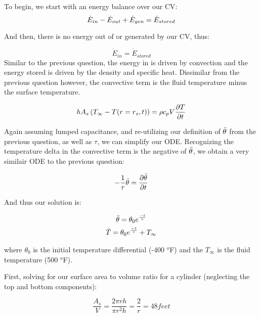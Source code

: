 \documentclass{article}
\begin{document}

To begin, we start with an energy balance over our CV:
\begin{equation}
    \Dot{E}_{in} - \Dot{E}_{out} + \Dot{E}_{gen} = \Dot{E}_{stored}
\end{equation}

And then, there is no energy out of or generated by our CV, thus:

\begin{equation}
    \Dot{E}_{in} = \Dot{E}_{stored}
\end{equation}
Similar to the previous question, the energy in is driven by convection and the energy stored is driven by the density and specific heat. Dissimilar from the previous question however, the convective term is the fluid temperature minus the surface temperature.

\begin{equation}
    h A_s\left(T_{\infty} - T(r = r_s, t)\right) = \rho c_p V \frac{\partial T}{\partial t}
\end{equation}

Again assuming lumped capacitance, and re-utilizing our definition of $\Bar{\theta}$ from the previous question, as well as $\tau$, we can simplify our ODE. Recognizing the temperature delta in the convective term is the negative of $\Bar{\theta}$, we obtain a very similair ODE to the previous question:

\begin{equation}
    -\frac{1}{\tau} \Bar{\theta} = \frac{\partial \Bar{\theta}}{\partial t}
\end{equation}

And thus our solution is:

\begin{equation}
    \begin{gathered}
        \Bar{\theta} = \theta_0 e^{\frac{-t}{\tau}} \\
        \Bar{T} = \theta_0 e^{\frac{-t}{\tau}} + T_{\infty}
    \end{gathered}
\end{equation}

where $\theta_0$ is the initial temperature differential (-400 $^o$F) and the $T_{\infty}$ is the fluid temperature (500 $^o$F). 

First, solving for our surface area to volume ratio for a cylinder (neglecting the top and bottom components):

\begin{equation}
    \frac{A_s}{V} = \frac{2\pi rh}{\pi r^2h} = \frac{2}{r} = 48 feet
\end{equation}
\end{document}
